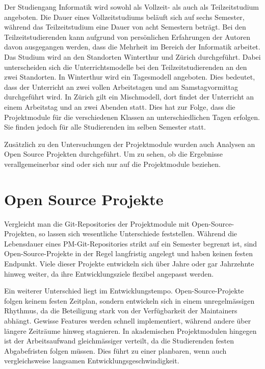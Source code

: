 Der Studiengang Informatik wird sowohl als Vollzeit- als auch als Teilzeitstudium angeboten. Die Dauer eines Vollzeitstudiums beläuft sich auf sechs Semester, während das Teilzeitstudium eine Dauer von acht Semestern beträgt. Bei den Teilzeitstudierenden kann aufgrund von persönlichen Erfahrungen der Autoren davon ausgegangen werden, dass die Mehrheit im Bereich der Informatik arbeitet. Das Studium wird an den Standorten Winterthur und Zürich durchgeführt. Dabei unterscheiden sich die Unterrichtsmodelle bei den Teilzeitstudierenden an den zwei Standorten. In Winterthur wird ein Tagesmodell angeboten. Dies bedeutet, dass der Unterricht an zwei vollen Arbeitstagen und am Samstagvormittag durchgeführt wird. In Zürich gilt ein Mischmodell, dort findet der Unterricht an einem Arbeitstag und an zwei Abenden statt. Dies hat zur Folge, dass die Projektmodule für die verschiedenen Klassen an unterschiedlichen Tagen erfolgen. Sie finden jedoch für alle Studierenden im selben Semester statt. \parencite{noauthor_bachelorstudium_nodate}\parencite{noauthor_teilzeitstudium_nodate}

Zusätzlich zu den Untersuchungen der Projektmodule wurden auch Analysen an Open Source Projekten durchgeführt. Um zu sehen, ob die Ergebnisse verallgemeinerbar sind oder sich nur auf die Projektmodule beziehen.

\section{ Open Source Projekte}
Vergleicht man die Git-Repositories der Projektmodule mit Open-Source-Projekten, so lassen sich wesentliche Unterschiede feststellen. Während die Lebensdauer eines PM-Git-Repositories strikt auf ein Semester begrenzt ist, sind Open-Source-Projekte in der Regel langfristig angelegt und haben keinen festen Endpunkt. Viele dieser Projekte entwickeln sich über Jahre oder gar Jahrzehnte hinweg weiter, da ihre Entwicklungsziele flexibel angepasst werden.

Ein weiterer Unterschied liegt im Entwicklungstempo. Open-Source-Projekte folgen keinem festen Zeitplan, sondern entwickeln sich in einem unregelmässigen Rhythmus, da die Beteiligung stark von der Verfügbarkeit der Maintainers abhängt. Gewisse Features werden schnell implementiert, während andere über längere Zeiträume hinweg stagnieren. In akademischen Projektmodulen hingegen ist der Arbeitsaufwand gleichmässiger verteilt, da die Studierenden festen Abgabefristen folgen müssen. Dies führt zu einer planbaren, wenn auch vergleichsweise langsamen Entwicklungsgeschwindigkeit.

